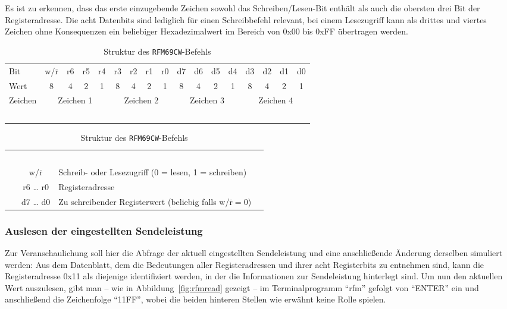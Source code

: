 \documentclass[pdftex, parskip, numbers=noenddot, toc=listof]{scrbook}
\begin{document}
	Es ist zu erkennen, dass das erste einzugebende Zeichen sowohl das Schreiben/Lesen-Bit enthält als auch die obersten drei Bit der Registeradresse. Die acht Datenbits sind lediglich für einen Schreibbefehl relevant, bei einem Lesezugriff kann als drittes und viertes Zeichen ohne Konsequenzen ein beliebiger Hexadezimalwert im Bereich von 0x00 bis 0xFF übertragen werden.

	\begin{table}[hb]
		\begin{center}
			\begin{tabularx}{.95\textwidth}{Xc|*{7}c|*{8}c}
				\hline\hline
				Bit  & w/$\overline{\mbox{r}}$ & r6 & r5 & r4                      & r3 & r2 & r1 & r0                      & d7 & d6 & d5 & d4                      & d3 & d2 & d1 & d0                    \\
				Wert & 8                       & 4  & 2  & \multicolumn{1}{c||}{1} & 8  & 4  & 2  & \multicolumn{1}{c||}{1} & 8  & 4  & 2  & \multicolumn{1}{c||}{1} & 8  & 4  & 2  & \multicolumn{1}{c}{1} \\
				Zeichen & \multicolumn{4}{c||}{Zeichen 1} & \multicolumn{4}{c||}{Zeichen 2} & \multicolumn{4}{c||}{Zeichen 3} & \multicolumn{4}{c}{Zeichen 4} \\ ~ \\ \hline
			\end{tabularx}
			\begin{tabularx}{.95\textwidth}{p{2cm}cXp{2cm}}
				~ \\
				  & w/$\overline{\mbox{r}}$ & Schreib- oder Lesezugriff (0 = lesen, 1 = schreiben)                      \\
				  & r6 {\dots} r0           & Registeradresse                                                           \\
				  & d7 {\dots} d0           & Zu schreibender Registerwert (beliebig falls w/$\overline{\mbox{r}} = 0$) \\ \hline\hline
			\end{tabularx}
		\end{center}
		\caption{Struktur des \texttt{RFM69CW}-Befehls}
		\label{tab:rfmcommand}
	\end{table}

	\subsubsection{Auslesen der eingestellten Sendeleistung}
	\label{subsec:readpower}

	Zur Veranschaulichung soll hier die Abfrage der aktuell eingestellten Sendeleistung und eine anschließende Änderung derselben simuliert werden: Aus dem Datenblatt, dem die Bedeutungen aller Registeradressen und ihrer acht Registerbits zu entnehmen sind, kann die Registeradresse 0x11 als diejenige identifiziert werden, in der die Informationen zur Sendeleistung hinterlegt sind. Um nun den aktuellen Wert auszulesen, gibt man -- wie in Abbildung~\ref{fig:rfmread} gezeigt -- im Terminalprogramm \enquote{rfm} gefolgt von \enquote{ENTER} ein und anschließend die Zeichenfolge \enquote{11FF}, wobei die beiden hinteren Stellen wie erwähnt keine Rolle spielen.
\end{document}
